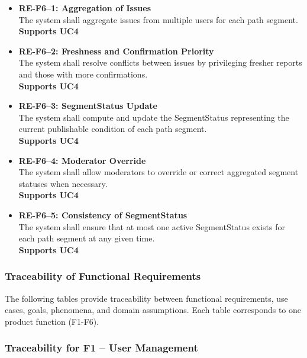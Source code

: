 \begin{itemize}

    \item \textbf{RE-F6--1: Aggregation of Issues}\label{req:RE-F6-1}\\
    The system shall aggregate issues from multiple users for each path segment.\\
    \textbf{Supports UC4}

    \item \textbf{RE-F6--2: Freshness and Confirmation Priority}\label{req:RE-F6-2}\\
    The system shall resolve conflicts between issues by privileging fresher reports 
    and those with more confirmations.\\
    \textbf{Supports UC4}

    \item \textbf{RE-F6--3: SegmentStatus Update}\label{req:RE-F6-3}\\
    The system shall compute and update the SegmentStatus representing the current 
    publishable condition of each path segment.\\
    \textbf{Supports UC4}

    \item \textbf{RE-F6--4: Moderator Override}\label{req:RE-F6-4}\\
    The system shall allow moderators to override or correct aggregated segment statuses 
    when necessary.\\
    \textbf{Supports UC4}

    \item \textbf{RE-F6--5: Consistency of SegmentStatus}\label{req:RE-F6-5}\\
    The system shall ensure that at most one active SegmentStatus exists for each 
    path segment at any given time.\\
    \textbf{Supports UC4}

\end{itemize}

\subsubsection{Traceability of Functional Requirements}

The following tables provide traceability between functional requirements, use cases, goals, phenomena, and domain assumptions. Each table corresponds to one product function (F1-F6).

\subsubsection{Traceability for F1 -- User Management}

